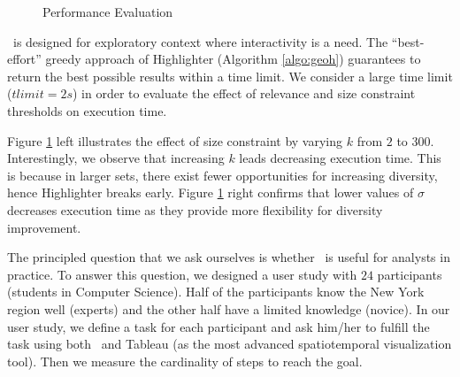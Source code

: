 \begin{figure}
\begin{minipage}[b]{0.45\linewidth}
\end{minipage} 
  \caption{Performance Evaluation}
\vspace{-10pt}
\label{fig:performance}
\end{figure}


\vspace{5pt}
 \framework\ is designed for exploratory context where interactivity is a need. The ``best-effort'' greedy approach of {\sc Highlighter} (Algorithm \ref{algo:geoh}) guarantees to return the best possible results within a time limit. We consider a large time limit ($tlimit = 2s$) in order to evaluate the effect of relevance and size constraint thresholds on execution time.

Figure \ref{fig:performance} left illustrates the effect of size constraint by varying $k$ from $2$ to $300$. Interestingly, we observe that increasing $k$ leads decreasing execution time. This is because in larger sets, there exist fewer opportunities for increasing diversity, hence {\sc Highlighter} breaks early. Figure \ref{fig:performance} right confirms that lower values of $\sigma$ decreases execution time as they provide more flexibility for diversity improvement.

\vspace{5pt}
The principled question that we ask ourselves is whether \framework\ is useful for analysts in practice. To answer this question, we designed a user study with $24$ participants (students in Computer Science). Half of the participants know the New York region well (experts) and the other half have a limited knowledge (novice). In our user study, we define a task for each participant and ask him/her to fulfill the task using both \framework\ and {\sc Tableau} (as the most advanced spatiotemporal visualization tool). Then we measure the cardinality of steps to reach the goal.

